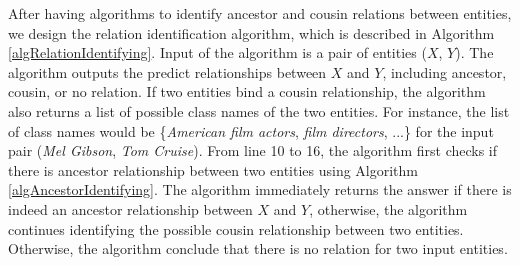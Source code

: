 After having algorithms to identify ancestor and cousin relations between entities, we design the relation identification algorithm, which is described in Algorithm \ref{algRelationIdentifying}. Input of the algorithm is a pair of entities ($X$, $Y$). The algorithm outputs the predict relationships between $X$ and $Y$, including ancestor, cousin, or no relation. If two entities bind a cousin relationship, the algorithm also returns a list of possible class names of the two entities. For instance, the list of class names would be \{{\em American film actors}, {\em film directors}, ...\} for the input pair ({\em Mel Gibson}, {\em Tom Cruise}). From line 10 to 16, the algorithm first checks if there is ancestor relationship between two entities using Algorithm \ref{algAncestorIdentifying}. The algorithm immediately returns the answer if there is indeed an ancestor relationship between $X$ and $Y$, otherwise, the algorithm continues identifying the possible cousin relationship between two entities. 
Otherwise, the algorithm conclude that there is no relation for two input entities.

% 





